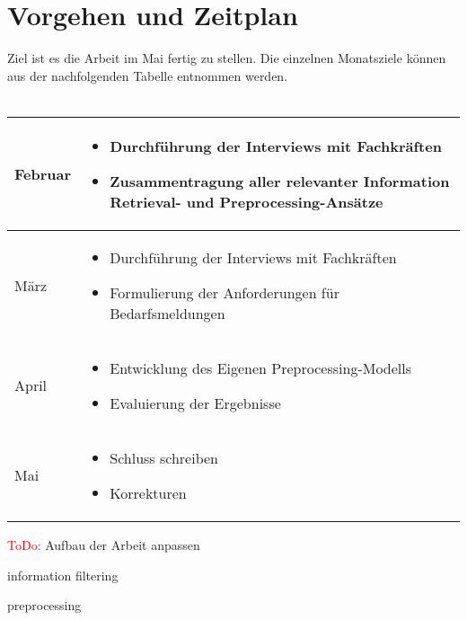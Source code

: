 \documentclass[a4paper,12pt]{scrreprt}
\newcommand{\hiddenchapter}[1]{
	\chapter*{{#1}}
}
\newcommand{\todo}[1]{\textcolor{red}{ToDo:} #1\marginpar{<--hier}}
\begin{document}
\hiddenchapter{Vorgehen und Zeitplan}
Ziel ist es die Arbeit im Mai fertig zu stellen. Die einzelnen Monatsziele können aus der nachfolgenden Tabelle entnommen werden. \\ \\
\begin{tabularx}{1\textwidth} { 
		| >{\raggedright\arraybackslash}X 
		| >{\raggedright\arraybackslash}X | }
	\hline
	Februar
	& \begin{itemize}
		\item Durchführung der Interviews mit Fachkräften
		\item Zusammentragung aller relevanter Information Retrieval- und Preprocessing-Ansätze 
	\end{itemize}\\
	\hline
	März
	& \begin{itemize}
		\item Durchführung der Interviews mit Fachkräften
		\item Formulierung der Anforderungen für Bedarfsmeldungen
	\end{itemize}\\
	\hline
	April
	& \begin{itemize}
		\item Entwicklung des Eigenen Preprocessing-Modells
		\item Evaluierung der Ergebnisse
	\end{itemize}\\
	\hline
	Mai
	& \begin{itemize}
		\item Schluss schreiben
		\item Korrekturen
	\end{itemize}\\
	\hline
\end{tabularx}
\newpage

\renewcommand\contentsname{Aufbau der Arbeit}
\todo{Aufbau der Arbeit anpassen}
\tableofcontents

\cite{kobayashi2000information}

\cite{singhal2001modern}

\cite{croft2000combining}

\cite{horesh2016information}

\cite{belkin1992information}

information filtering
\cite{lanquillon2001enhancing}

preprocessing
\cite{alasadi2017review}
\end{document}

